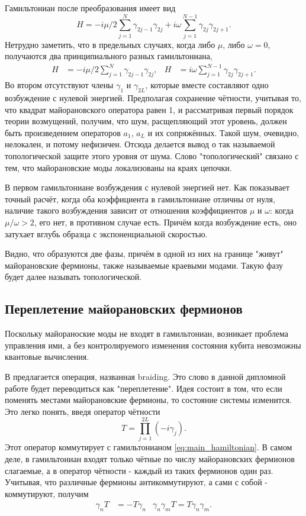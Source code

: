 \documentclass[a4paper,12pt]{article}
\theoremstyle{plain} %
\theoremstyle{definition} %
\theoremstyle{remark} %
\begin{document}
Гамильтониан после преобразования имеет вид
\begin{equation}
H = -i\mu/2 \sum\limits_{j=1}^N \gamma_{2j-1} \gamma_{2j} + i \omega \sum\limits_{j=1}^{N-1} \gamma_{2j} \gamma_{2j+1}.
\label{eq:main_hamiltonian}
\end{equation}
Нетрудно заметить, что в предельных случаях, когда либо $\mu$, либо $\omega = 0$, получаются два принципиального разных гамильтониана,
\begin{align}
H &= -i\mu/2 \sum\limits_{j=1}^N \gamma_{2j-1} \gamma_{2j}, & H &= i \omega \sum\limits_{j=1}^{N-1} \gamma_{2j} \gamma_{2j+1}.
\end{align}
Во втором отсутствуют члены $\gamma_1$ и $\gamma_{2L}$, которые вместе составляют одно возбуждение с нулевой энергией. Предполагая сохранение чётности, учитывая то, что квадрат майорановского оператора равен 1, и рассматривая первый порядок теории возмущений, получим, что шум, расщепляющий этот уровень, должен быть произведением операторов $a_1$, $a_L$ и их сопряжённых. Такой шум, очевидно, нелокален, и потому нефизичен. Отсюда делается вывод о так называемой топологической защите этого уровня от шума. Слово "топологический"$ $ связано с тем, что майорановские моды локализованы на краях цепочки.

В первом гамильтониане возбуждения с нулевой энергией нет. Как показывает точный расчёт, когда оба коэффициента в гамильтониане отличны от нуля, наличие такого возбуждения зависит от отношения коэффициентов $\mu$ и $\omega$: когда $\mu/\omega > 2$, его нет, в противном случае есть. Причём когда возбуждение есть, оно затухает вглубь образца с экспоненциальной скоростью.

Видно, что образуются две фазы, причём в одной из них на границе "живут"$ $ майорановские фермионы, также называемые краевыми модами. Такую фазу будет далее называть топологической.


\subsection{Переплетение майорановских фермионов}

Поскольку майораноские моды не входят в гамильтониан, возникает проблема управления ими, а без контролируемого изменения состояния кубита невозможны квантовые вычисления.

В \cite{braiding} предлагается операция, названная braiding. Это слово в данной дипломной работе будет переводиться как "переплетение"$ $. Идея состоит в том, что если поменять местами майорановские фермионы, то состояние системы изменится. Это легко понять, введя оператор чётности
\begin{equation}
T = \prod\limits_{j=1}^{2L} (-i \gamma_j).
\end{equation}
Этот оператор коммутирует с гамильтонианом \ref{eq:main_hamiltonian}. В самом деле, в гамильтониан входят только чётные по числу майорановских фермионов слагаемые, а в оператор чётности - каждый из таких фермионов один раз. Учитывая, что различные фермионы антикоммутируют, а сами с собой - коммутируют, получим
\begin{align}
\gamma_n T &= - T \gamma_n & \gamma_n \gamma_m T = T \gamma_n \gamma_m.
\end{align}
\end{document}
